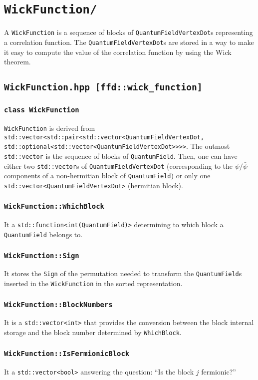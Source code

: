 \chapter{\texttt{WickFunction/}}
A \texttt{WickFunction} is a sequence of blocks of \texttt{QuantumFieldVertexDot}s representing a correlation function. The \texttt{QuantumFieldVertexDot}s are stored in a way to make it easy to compute the value of the correlation function by using the Wick theorem.
\section{\texttt{WickFunction.hpp [ffd::wick\_function]}}
\subsection{\texttt{class WickFunction}}
\texttt{WickFunction} is derived from \texttt{std::vector<std::pair<std::vector<QuantumFieldVertexDot, std::optional<std::vector<QuantumFieldVertexDot>>>>}. The outmost \texttt{std::vector} is the sequence of blocks of \texttt{QuantumField}. Then, one can have either two \texttt{std::vector}s of \texttt{QuantumFieldVertexDot} (corresponding to the $\psi/\bar{\psi}$ components of a  non-hermitian block of \texttt{QuantumField}) or only one \texttt{std::vector<QuantumFieldVertexDot>} (hermitian block).
\subsection{\texttt{WickFunction::WhichBlock}}
It a \texttt{std::function<int(QuantumField)>} determining to which block a \texttt{QuantumField} belongs to.
\subsection{\texttt{WickFunction::Sign}}
It stores the \texttt{Sign} of the permutation needed to transform the \texttt{QuantumField}s inserted in the \texttt{WickFunction} in the sorted representation.
\subsection{\texttt{WickFunction::BlockNumbers}}
It is a \texttt{std::vector<int>} that provides the conversion between the block internal storage and the block number determined by \texttt{WhichBlock}.
\subsection{\texttt{WickFunction::IsFermionicBlock}}
It a \texttt{std::vector<bool>} answering the question: ``Is the block $j$ fermionic?''
